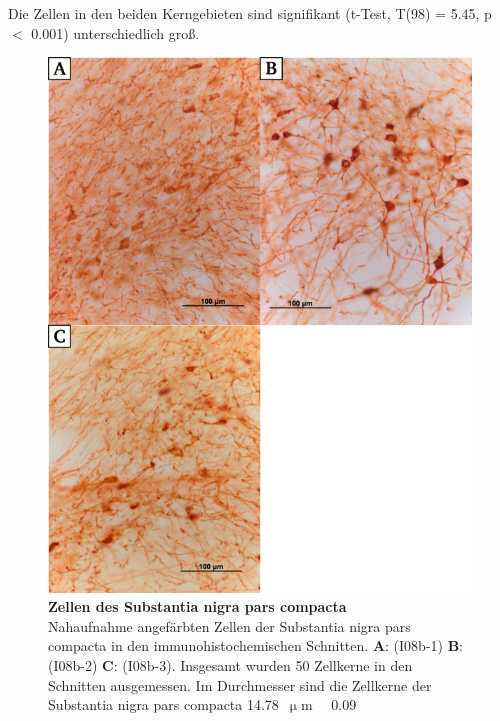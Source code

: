 \documentclass[12pt,a4paper,pdftex]{article}
\newcommand{\rpm}{\raisebox{.2ex}{$\scriptstyle\pm$} }
\begin{document}
Die Zellen in den beiden Kerngebieten sind signifikant (t-Test, T(98) = 5.45, p $<$ 0.001) unterschiedlich groß.

\begin{figure}[H]
    \centering
    \includegraphics{pictures/immu/Zellen_SNC.png}
    \caption[Zellen des Substantia nigra pars compacta]{\textbf{Zellen des Substantia nigra pars compacta}\\
    Nahaufnahme angefärbten Zellen der Substantia nigra pars compacta in den immunohistochemischen Schnitten. \textbf{A}: (I08b-1) \textbf{B}: (I08b-2) \textbf{C}: (I08b-3). Insgesamt wurden 50 Zellkerne in den Schnitten ausgemessen. Im Durchmesser sind die Zellkerne der Substantia nigra pars compacta 14.78~$\upmu$m~\rpm~0.09}
    \label{fig:Zellen_SNC}
\end{figure}

\newpage



\printindex
\end{document}
